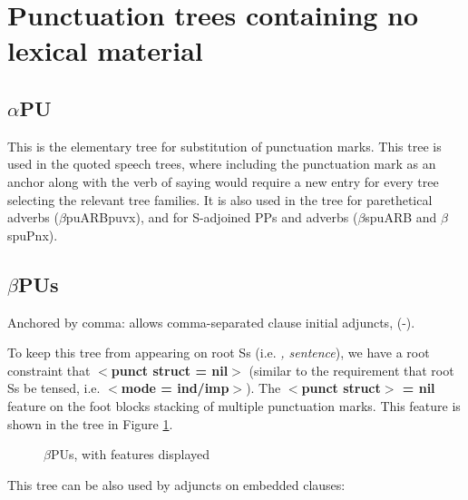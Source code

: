 
\section{Punctuation trees containing no lexical material}

\subsection{$\alpha$PU}

This is the elementary tree for substitution of punctuation
marks. This tree is used in the quoted speech trees, where including
the punctuation mark as an anchor along with the verb of saying would
require a new entry for every tree selecting the relevant tree
families. It is also used in the tree for parethetical adverbs
($\beta$puARBpuvx), and for S-adjoined PPs and adverbs ($\beta$spuARB
and $\beta$spuPnx).

\subsection{$\beta$PUs}

Anchored by comma: allows comma-separated clause initial adjuncts,
(-).



To keep this tree from appearing on root Ss (i.e. {\it , sentence}),
we have a root constraint that {\bf $<$punct struct = nil$>$} (similar
to the requirement that root Ss be tensed, i.e. {\bf $<$mode =
ind/imp$>$}).  The {\bf $<$punct struct$>$ = nil} feature on the foot
blocks stacking of multiple punctuation marks. This feature is shown
in the tree in Figure \ref{PUs}.

\begin{figure}[hbt]
\centering
\hspace{0.0in}
\caption{$\beta$PUs, with features displayed}
\label{PUs}
\end{figure}

This tree can be also used by adjuncts on embedded clauses:



